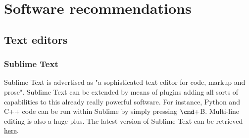 
\section{Software recommendations}
\subsection{Text editors}
\subsubsection{Sublime Text}
Sublime Text is advertised as "a sophisticated text editor for code, markup and prose". Sublime Text can be extended by means of plugins adding all sorts of capabilities to this already really powerful software. For instance, Python and C++ code can be run within Sublime by simply pressing $\cmd + $B. Multi-line editing is also a huge plus.
The latest version of Sublime Text can be retrieved \href{https://www.sublimetext.com/}{here}. 
